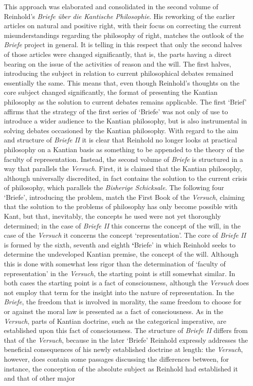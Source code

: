  This approach was elaborated and consolidated in the second volume of Reinhold's \textit{Briefe \"{u}ber die Kantische Philosophie}. His reworking of the earlier articles on natural and positive right, with their focus on correcting the current misunderstandings regarding the philosophy of right, matches the outlook of the \textit{Briefe} project in general. It is telling in this respect that only the second halves of those articles were changed significantly, that is, the parts having a direct bearing on the issue of the activities of reason and the will. The first halves, introducing the subject in relation to current philosophical debates remained essentially the same. This means that, even though Reinhold's thoughts on the core subject changed significantly, the format of presenting the Kantian philosophy as the solution to current debates remains applicable. The first `Brief' affirms that the strategy of the first series of `Briefe' was not only of use to introduce a wider audience to the Kantian philosophy, but is also instrumental in solving debates occasioned by the Kantian philosophy. With regard to the aim and structure of \textit{Briefe} \textit{II} it is clear that Reinhold no longer looks at practical philosophy on a Kantian basis as something to be appended to the theory of the faculty of representation. Instead, the second volume of \textit{Briefe} is structured in a way that parallels the \textit{Versuch}. First, it is claimed that the Kantian philosophy, although universally discredited, in fact contains the solution to the current crisis of philosophy, which parallels the \textit{Bisherige Schicksale}. The following four `Briefe', introducing the problem, match the First Book of the \textit{Versuch}, claiming that the solution to the problems of philosophy has only become possible with Kant, but that, inevitably, the concepts he used were not yet thoroughly determined; in the case of \textit{Briefe II} this concerns the concept of the will, in the case of the \textit{Versuch} it concerns the concept `representation'. The core of \textit{Briefe} \textit{II} is formed by the sixth, seventh and eighth \textbf{`}Briefe' in which Reinhold seeks to determine the undeveloped Kantian premise, the concept of the will. Although this is done with somewhat less rigor than the determination of `faculty of representation' in the \textit{Versuch}, the starting point is still somewhat similar. In both cases the starting point is a fact of consciousness, although the \textit{Versuch} does not employ that term for the insight into the nature of representation. In the \textit{Briefe}, the freedom that is involved in morality, the same freedom to choose for or against the moral law is presented as a fact of consciousness. As in the \textit{Versuch}, parts of Kantian doctrine, such as the categorical imperative, are established upon this fact of consciousness. The structure of \textit{Briefe II} differs from that of the \textit{Versuch}, because in the later `Briefe' Reinhold expressly addresses the beneficial consequences of his newly established doctrine at length: the \textit{Versuch}, however, does contain some passages discussing the differences between, for instance, the conception of the absolute subject as Reinhold had established it and that of other major 